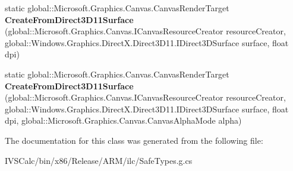 \begin{DoxyCompactItemize}
\item 
\mbox{\label{class_microsoft_1_1_graphics_1_1_canvas_1_1_canvas_render_target_a3aab21df283c755cb1bc43211916da41}} 
static global\+::\+Microsoft.\+Graphics.\+Canvas.\+Canvas\+Render\+Target {\bfseries Create\+From\+Direct3\+D11\+Surface} (global\+::\+Microsoft.\+Graphics.\+Canvas.\+I\+Canvas\+Resource\+Creator resource\+Creator, global\+::\+Windows.\+Graphics.\+Direct\+X.\+Direct3\+D11.\+I\+Direct3\+D\+Surface surface, float dpi)
\item 
\mbox{\label{class_microsoft_1_1_graphics_1_1_canvas_1_1_canvas_render_target_aaa9628136a19a0737f5229fbb9c84e55}} 
static global\+::\+Microsoft.\+Graphics.\+Canvas.\+Canvas\+Render\+Target {\bfseries Create\+From\+Direct3\+D11\+Surface} (global\+::\+Microsoft.\+Graphics.\+Canvas.\+I\+Canvas\+Resource\+Creator resource\+Creator, global\+::\+Windows.\+Graphics.\+Direct\+X.\+Direct3\+D11.\+I\+Direct3\+D\+Surface surface, float dpi, global\+::\+Microsoft.\+Graphics.\+Canvas.\+Canvas\+Alpha\+Mode alpha)
\end{DoxyCompactItemize}


The documentation for this class was generated from the following file\+:\begin{DoxyCompactItemize}
\item 
I\+V\+S\+Calc/bin/x86/\+Release/\+A\+R\+M/ilc/Safe\+Types.\+g.\+cs\end{DoxyCompactItemize}
